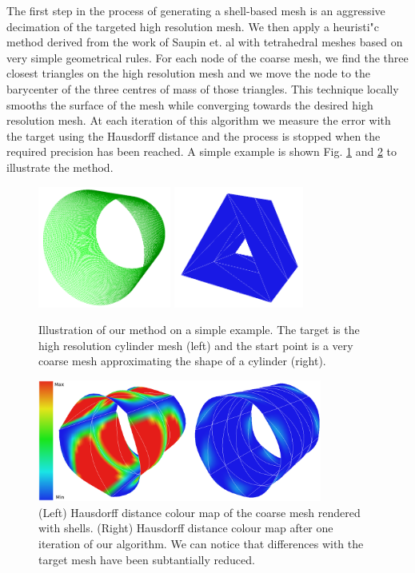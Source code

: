 \documentclass{llncs}
\begin{document}
The first step in the process of generating a shell-based mesh is an aggressive decimation of the targeted high resolution mesh. We then apply a heuristi"c method derived from the work of Saupin et. al \cite{Saupin07} with tetrahedral meshes based on very simple geometrical rules. For each node of the coarse mesh, we find the three closest triangles on the high resolution mesh and we move the node to the barycenter of the three centres of mass of those triangles. This technique locally smooths the surface of the mesh while converging towards the desired high resolution mesh. At each iteration of this algorithm we measure the error with the target using the Hausdorff distance and the process is stopped when the required precision has been reached. A simple example is shown Fig. \ref{fig-cylinder} and \ref{fig-cylinderResults} to illustrate the method. 

\begin{figure}
\centering
\includegraphics[height=4cm]{images/cylinderHighWireframe}
\includegraphics[height=4cm]{images/cylinderLow}
\caption {Illustration of our method on a simple example. The target is the high resolution cylinder mesh (left) and the start point is a very coarse mesh approximating the shape of a cylinder (right).}
\label{fig-cylinder}
\end{figure}

\begin{figure}
\centering
\includegraphics[height=4cm]{images/cylinderResults2}
\caption {(Left) Hausdorff distance colour map of the coarse mesh rendered with shells. (Right) Hausdorff distance colour map after one iteration of our algorithm. We can notice that differences with the target mesh have been subtantially reduced.}
\label{fig-cylinderResults}
\end{figure}
\end{document}
